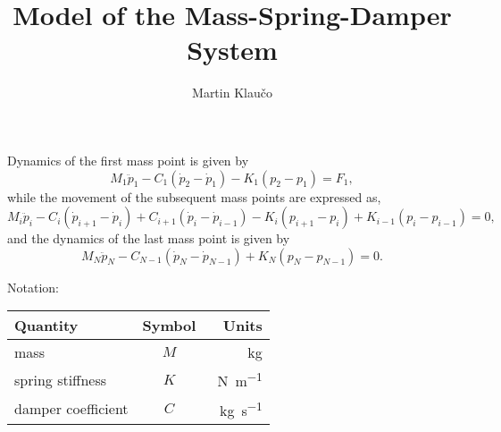 \documentclass{article}
\title{Model of the Mass-Spring-Damper System}
\author{Martin Klau\v{c}o}
\begin{document}
\maketitle

Dynamics of the first mass point is given by
\begin{equation}
	\label{eq:msd:1}
	M_1\ddot{p}_1 - C_1(\dot{p}_2 - \dot{p}_1) - K_1(p_2-p_1) = F_1,
\end{equation}
while the movement of the subsequent mass points are expressed as,
\begin{equation}
	\label{eq:msd:i}
		M_i\ddot{p}_i - C_i(\dot{p}_{i+1} - \dot{p}_i) + C_{i+1}(\dot{p}_i - 
		\dot{p}_{i-1})- K_i(p_{i+1} - p_i) + K_{i-1}(p_i - p_{i-1}) = 0,
\end{equation}
and the dynamics of the last mass point is given by
\begin{equation}
	\label{eq:msd:N}
		M_{N}\ddot{p}_{N} - C_{N-1}(\dot{p}_{N} - 
	\dot{p}_{N-1}) + 	K_{N}(p_{N}-p_{N-1}) = 0.
\end{equation}

Notation:

\begin{tabular}{lcr}\toprule
	Quantity & Symbol & Units \\ \midrule
	mass & $M$ & \SI{}{\kilogram} \\
	spring stiffness & $K$ & \SI{}{\newton\per\meter} \\
	damper coefficient & $C$ & \SI{}{\kilogram\per\second} \\
\bottomrule
\end{tabular}
\end{document}
